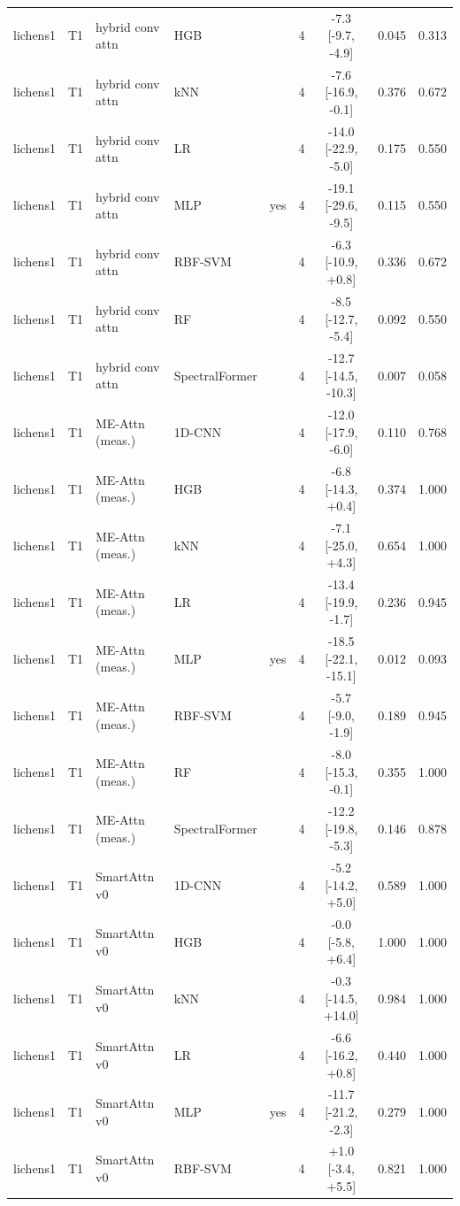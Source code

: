 \begin{tabular}{lllllcccc}
lichens1 & T1 & hybrid conv attn & HGB &  & 4 & -7.3 [-9.7, -4.9] & 0.045 & 0.313 \\
lichens1 & T1 & hybrid conv attn & kNN &  & 4 & -7.6 [-16.9, -0.1] & 0.376 & 0.672 \\
lichens1 & T1 & hybrid conv attn & LR &  & 4 & -14.0 [-22.9, -5.0] & 0.175 & 0.550 \\
lichens1 & T1 & hybrid conv attn & MLP & yes & 4 & -19.1 [-29.6, -9.5] & 0.115 & 0.550 \\
lichens1 & T1 & hybrid conv attn & RBF-SVM &  & 4 & -6.3 [-10.9, +0.8] & 0.336 & 0.672 \\
lichens1 & T1 & hybrid conv attn & RF &  & 4 & -8.5 [-12.7, -5.4] & 0.092 & 0.550 \\
lichens1 & T1 & hybrid conv attn & SpectralFormer &  & 4 & -12.7 [-14.5, -10.3] & 0.007 & 0.058 \\
lichens1 & T1 & ME-Attn (meas.) & 1D-CNN &  & 4 & -12.0 [-17.9, -6.0] & 0.110 & 0.768 \\
lichens1 & T1 & ME-Attn (meas.) & HGB &  & 4 & -6.8 [-14.3, +0.4] & 0.374 & 1.000 \\
lichens1 & T1 & ME-Attn (meas.) & kNN &  & 4 & -7.1 [-25.0, +4.3] & 0.654 & 1.000 \\
lichens1 & T1 & ME-Attn (meas.) & LR &  & 4 & -13.4 [-19.9, -1.7] & 0.236 & 0.945 \\
lichens1 & T1 & ME-Attn (meas.) & MLP & yes & 4 & -18.5 [-22.1, -15.1] & 0.012 & 0.093 \\
lichens1 & T1 & ME-Attn (meas.) & RBF-SVM &  & 4 & -5.7 [-9.0, -1.9] & 0.189 & 0.945 \\
lichens1 & T1 & ME-Attn (meas.) & RF &  & 4 & -8.0 [-15.3, -0.1] & 0.355 & 1.000 \\
lichens1 & T1 & ME-Attn (meas.) & SpectralFormer &  & 4 & -12.2 [-19.8, -5.3] & 0.146 & 0.878 \\
lichens1 & T1 & SmartAttn v0 & 1D-CNN &  & 4 & -5.2 [-14.2, +5.0] & 0.589 & 1.000 \\
lichens1 & T1 & SmartAttn v0 & HGB &  & 4 & -0.0 [-5.8, +6.4] & 1.000 & 1.000 \\
lichens1 & T1 & SmartAttn v0 & kNN &  & 4 & -0.3 [-14.5, +14.0] & 0.984 & 1.000 \\
lichens1 & T1 & SmartAttn v0 & LR &  & 4 & -6.6 [-16.2, +0.8] & 0.440 & 1.000 \\
lichens1 & T1 & SmartAttn v0 & MLP & yes & 4 & -11.7 [-21.2, -2.3] & 0.279 & 1.000 \\
lichens1 & T1 & SmartAttn v0 & RBF-SVM &  & 4 & +1.0 [-3.4, +5.5] & 0.821 & 1.000 \\

\end{tabular}
